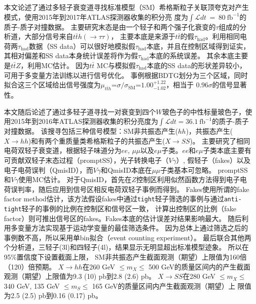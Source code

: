 本文论述了通过多轻子衰变道寻找标准模型（SM）希格斯粒子关联顶夸克对产生模式，使用2015年到2017年ATLAS探测器收集的积分亮
度为$\int \mathcal{L}dt~=~80~\text{fb}^{-1}$的质子-质子对撞数据。
主要研究末态是由一个轻子和两个强子化衰变的$\tau$组成的分析道\ltwotau ，大部分信号来自$t\bar{t}h(\rightarrow \tau\tau)$，
主要本底是来源于$t\bar{t}$的假$\tau_{\text{had}}$。利用相同电荷两$\tau_{\text{had}}$数据（SS data）可以很好地模拟假$\tau_{\text{had}}$本底，并且在控制区域得到证实，
其相对偏差和SS data本身统计误差将作为假$\tau_{\text{had}}$本底的系统误差。
其余本底主要是$t\bar{t}Z$，利用MC估计。
因为$t\bar{t}$ MC与模拟假$\tau_{\text{had}}$本底的SS data的形状差异较小，可用于多变量方法训练以进行信号优化。
事例根据BDTG划分为三个区域，同时拟合这三个区域给出信号强度为$\mu_{t\bar{t}h}$=$\sigma/\sigma_{\text{SM}}$=$1.00^{+1.22}_{-1.02}$，相当于
$0.96\sigma$的信号显著性。

本文随后论述了通过多轻子道寻找一对衰变到四个$W$玻色子的中性标量玻色子，使用2015年到2016年ATLAS探测器收集的积分亮度为$\int \mathcal{L}dt=36.1~\text{fb}^{-1}$的质子-质子对撞数据。
该搜寻包括三种信号模型：SM非共振态产生($hh$)，共振态产生($X\rightarrow hh$)和有两个重质量类希格斯粒子的共振态产生($X\rightarrow SS$)。
主要研究了相同电荷双轻子衰变道，根据轻子味道分为$ee$, $\mu\mu$以及$e\mu$子类。$ee$和$e\mu$子类本底主要有可贡献双轻子末态过程（promptSS），光子转换电子（$V\gamma$）,
假轻子（fakes）以及电子电荷误判（QmisID），而$V\gamma$和QmisID本底在$\mu\mu$子类基本可忽略。
promptSS和$V\gamma$使用MC估计。
对于QmisID，首先在$Z$控制区利用似然函数方法得到电子电荷误判率，随后应用到信号区相反电荷双轻子事例而得到。
Fakes使用所谓的fake factor method估计，该方法假设fakes中通过\texttt{tight}轻子筛选的事例与通过\texttt{anti-tight}轻子的事例的比例在控制区和信号区一致，
计算出控制区的比例（fake factor）则可推出信号区的fakes。Fakes本底的估计误差对结果影响最大。
随后利用多变量方法实现基于运动学变量的最佳筛选条件。
因为总体上通过筛选之后的事例数不高，所以采用单bin拟合（event counting experiment）。
最后联合其他两个分析道，三轻子(3l)和四轻子(4l)，结果显示无明显超出标准模型迹象。
所以在95\%置信度下设置截面上限，
SM非共振态产生截面观测（期望）上限值为160倍（120）倍预期。
$X\rightarrow hh$在260 GeV $\leq m_X\leq$ 500 GeV的质量区间内的产生截面观测（期望）上限值为9.3 (10) pb到2.8 (2.6) pb。
$X\rightarrow SS$在280 GeV $\leq m_X\leq$ 340 GeV, 135 GeV $\leq m_S\leq$ 165 GeV的质量区间内产生截面观测（期望）上
限值为2.5 (2.5) pb到0.16 (0.17) pb。

